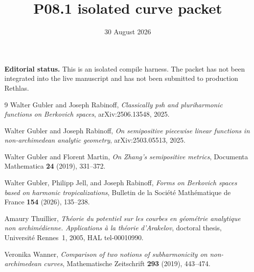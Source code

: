\documentclass[11pt]{article}
\title{P08.1 isolated curve packet}
\author{}
\date{30 August 2026}
\begin{document}
\maketitle

\noindent
\textbf{Editorial status.}
This is an isolated compile harness. The packet has not been integrated into
the live manuscript and has not been submitted to production Rethlas.




\begin{thebibliography}{9}
Walter Gubler and Joseph Rabinoff,
\emph{Classically psh and pluriharmonic functions on Berkovich spaces},
arXiv:2506.13548, 2025.

Walter Gubler and Joseph Rabinoff,
\emph{On semipositive piecewise linear functions in non-archimedean analytic
geometry}, arXiv:2503.05513, 2025.

Walter Gubler and Florent Martin,
\emph{On Zhang's semipositive metrics},
Documenta Mathematica \textbf{24} (2019), 331--372.

Walter Gubler, Philipp Jell, and Joseph Rabinoff,
\emph{Forms on Berkovich spaces based on harmonic tropicalizations},
Bulletin de la Soci\'et\'e Math\'ematique de France \textbf{154} (2026),
135--238.

Amaury Thuillier,
\emph{Th\'eorie du potentiel sur les courbes en g\'eom\'etrie analytique non
archim\'edienne. Applications \`a la th\'eorie d'Arakelov},
doctoral thesis, Universit\'e Rennes~1, 2005, HAL tel-00010990.

Veronika Wanner,
\emph{Comparison of two notions of subharmonicity on non-archimedean curves},
Mathematische Zeitschrift \textbf{293} (2019), 443--474.
\end{thebibliography}
\end{document}
